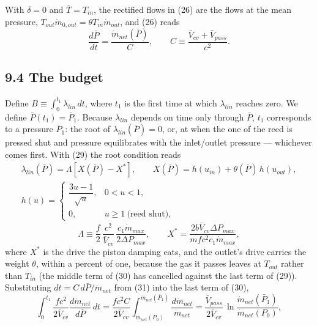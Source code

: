 \documentclass[11pt]{article}
\begin{document}
With $\delta = 0$ and $\bar T = T_{in}$, the rectified flows in (26) are the flows at the mean pressure, $T_{out}\dot m_{0,out} = \theta T_{in}\dot m_{out}$, and (26) reads
\begin{equation}
\frac{d\bar P}{dt} = \frac{\dot m_{net}(\bar P)}{C}, \qquad C \equiv \frac{\bar V_{cv} + \bar V_{pass}}{c^2} . \tag{31}
\end{equation}

\subsection*{9.4 The budget}

Define $B \equiv \int_0^{t_1}\lambda_{lin}\,dt$, where $t_1$ is the first time at which $\lambda_{lin}$ reaches zero. We define $\bar P(t_1) = \bar P_1$. Because $\lambda_{lin}$ depends on time only through $\bar P$, $t_1$ corresponds to a pressure $\bar P_1$: the root of $\lambda_{lin}(\bar P) = 0$, or, at when the one of the reed is pressed shut and pressure equilibrates with the inlet/outlet pressure --- whichever comes first. With (29) the root condition reads
\begin{equation}
\begin{gathered}
\lambda_{lin}(\bar P) = \Lambda\left[X(\bar P) - X^*\right], \qquad X(\bar P) = h(u_{in}) + \theta(\bar P)\,h(u_{out}), \\
h(u) = \begin{cases} \dfrac{3u-1}{\sqrt u}, & 0 < u < 1, \\[6pt] 0, & u \ge 1 \ \text{(reed shut)}, \end{cases}
\end{gathered} \tag{32a}
\end{equation}
\begin{equation}
\Lambda \equiv \frac{f}{2}\,\frac{c^2}{\bar V_{cv}}\,\frac{c_1\dot m_{max}}{2\Delta P_{max}}, \qquad
X^* = \frac{2b\bar V_{cv}\Delta P_{max}}{mfc^2c_1\dot m_{max}} , \tag{32b}
\end{equation}
where $X^*$ is the drive the piston damping eats, and the outlet's drive carries the weight $\theta$, within a percent of one, because the gas it passes leaves at $T_{out}$ rather than $T_{in}$ (the middle term of (30) has cancelled against the last term of (29)). Substituting $dt = C\,d\bar P/\dot m_{net}$ from (31) into the last term of (30),
\begin{equation}
\int_0^{t_1}\frac{f c^2}{2\bar V_{cv}}\frac{d\dot m_{net}}{d\bar P}\,dt = \frac{f c^2 C}{2\bar V_{cv}}\int_{\dot m_{net}(P_0)}^{\dot m_{net}(\bar P_1)}\frac{d\dot m_{net}}{\dot m_{net}} = \frac{\bar V_{pass}}{2\bar V_{cv}}\,\ln\frac{\dot m_{net}(\bar P_1)}{\dot m_{net}(P_0)}, \tag{32}
\end{equation}
\end{document}
